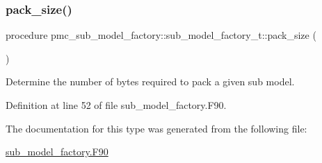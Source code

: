 \subsubsection{\texorpdfstring{pack\+\_\+size()}{pack\_size()}}
{\footnotesize\ttfamily procedure pmc\+\_\+sub\+\_\+model\+\_\+factory\+::sub\+\_\+model\+\_\+factory\+\_\+t\+::pack\+\_\+size (\begin{DoxyParamCaption}{ }\end{DoxyParamCaption})\hspace{0.3cm}{\ttfamily [private]}}



Determine the number of bytes required to pack a given sub model. 



Definition at line 52 of file sub\+\_\+model\+\_\+factory.\+F90.



The documentation for this type was generated from the following file\+:\begin{DoxyCompactItemize}
\item 
\mbox{\hyperlink{sub__model__factory_8_f90}{sub\+\_\+model\+\_\+factory.\+F90}}\end{DoxyCompactItemize}

